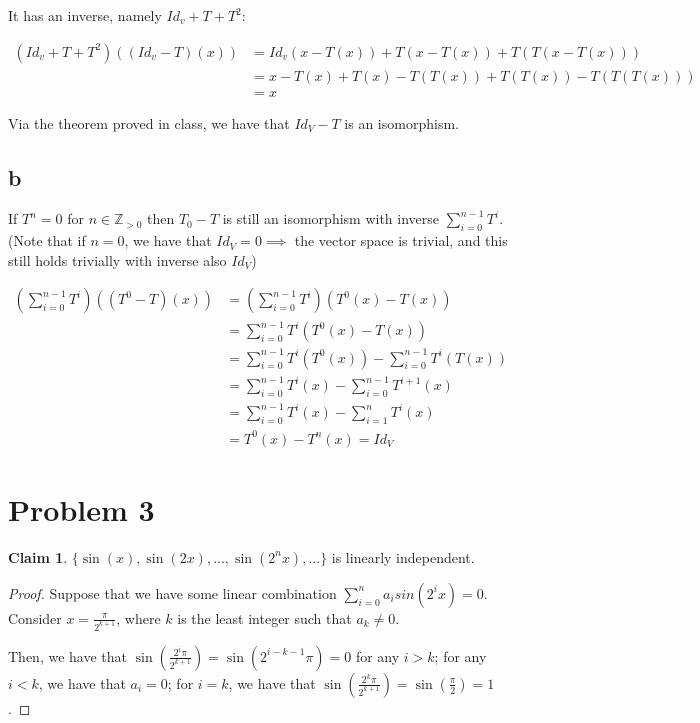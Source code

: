 \documentclass[12pt,letterpaper]{article}
\theoremstyle{definition}
\newtheorem*{claim}{Claim}
\newcommand{\Zg}{\mathbb{Z}_{>0}}
\begin{document}
It has an inverse, namely $Id_v + T + T^2$:

\begin{align*}
  (Id_v + T + T^2)((Id_v - T)(x)) &= Id_v(x - T(x)) + T(x - T(x)) + T(T(x - T(x))) \\
                                  &= x - T(x) + T(x) - T(T(x)) + T(T(x)) - T(T(T(x))) \\
                                  &= x
\end{align*}

Via the theorem proved in class, we have that $Id_V - T$ is an isomorphism.

\subsection*{b}

If $T^n = 0$ for $n \in \Zg$ then $T_0 - T$ is still an isomorphism with inverse
$\sum_{i=0}^{n-1}T^i$. (Note that if $n = 0$, we have that $Id_V = 0 \implies$
the vector space is trivial, and this still holds trivially with inverse also $Id_V$)

\begin{align*}
  (\sum_{i=0}^{n-1}T^i)((T^0-T)(x)) &= (\sum_{i=0}^{n-1}T^i)(T^0(x)-T(x)) \\
                                    &= \sum_{i=0}^{n-1}T^i(T^0(x) - T(x)) \\
                                    &= \sum_{i=0}^{n-1}T^i(T^0(x)) - \sum_{i=0}^{n-1}T^i(T(x)) \\
                                    &= \sum_{i=0}^{n-1}T^i(x) - \sum_{i=0}^{n-1}T^{i + 1}(x) \\
                                    &= \sum_{i=0}^{n-1}T^i(x) - \sum_{i=1}^{n}T^i(x) \\
                                    &= T^0(x) - T^n(x) = Id_V
\end{align*}


\section*{Problem 3}

\begin{claim}
  $\{\sin(x), \sin(2x),..., \sin(2^nx),...\}$ is linearly independent.
\end{claim}

\begin{proof}
  Suppose that we have some linear combination $\sum_{i=0}^na_isin(2^ix) = 0$.
  Consider $x = \frac{\pi}{2^{k+1}}$, where $k$ is the least integer such that
  $a_k \neq 0$.

  Then, we have that $\sin(\frac{2^i\pi}{2^{k+1}}) = \sin(2^{i - k - 1}\pi) = 0$ for
  any $i > k$; for any $i < k$, we have that $a_i = 0$; for $i = k$, we have
  that $\sin(\frac{2^k\pi}{2^{k+1}}) = \sin(\frac{\pi}{2}) = 1$.
\end{proof}
\end{document}
